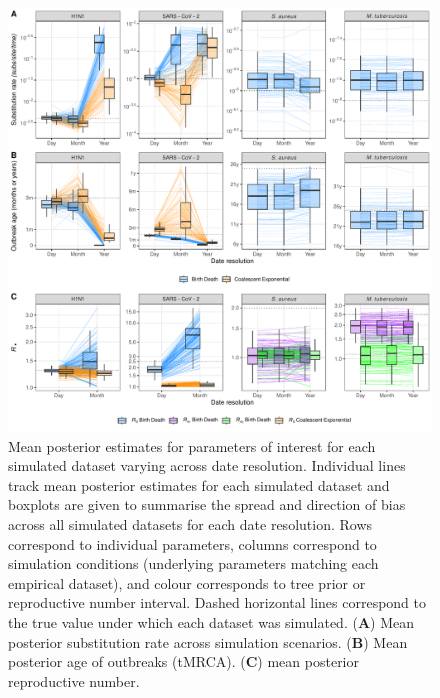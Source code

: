 \documentclass[11pt]{article}
\begin{document}
\begin{spacing}{1.5}
\begin{figure}[H]
    \centering
    \includegraphics[width=\textwidth]{simulation_parm_panel.pdf}
    \caption{Mean posterior estimates for parameters of interest for each simulated dataset varying across date resolution. Individual lines track mean posterior estimates for each simulated dataset and boxplots are given to summarise the spread and direction of bias across all simulated datasets for each date resolution. Rows correspond to individual parameters, columns correspond to simulation conditions (underlying parameters matching each empirical dataset), and colour corresponds to tree prior or reproductive number interval. Dashed horizontal lines correspond to the true value under which each dataset was simulated. (\textbf{A}) Mean posterior substitution rate across simulation scenarios. (\textbf{B}) Mean posterior age of outbreaks (tMRCA). (\textbf{C}) mean posterior reproductive number. }
    \label{fig:sim-parms}
\end{figure}


\end{spacing}
\end{document}
